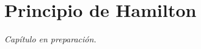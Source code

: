 \documentclass[../apunte_mecanica_clasica.tex]{subfiles}%
\begin{document}
\chapter{Principio de Hamilton}


\begin{center}
\vspace{1cm}
\textit{Capítulo en preparación.}
\end{center}
\end{document}
